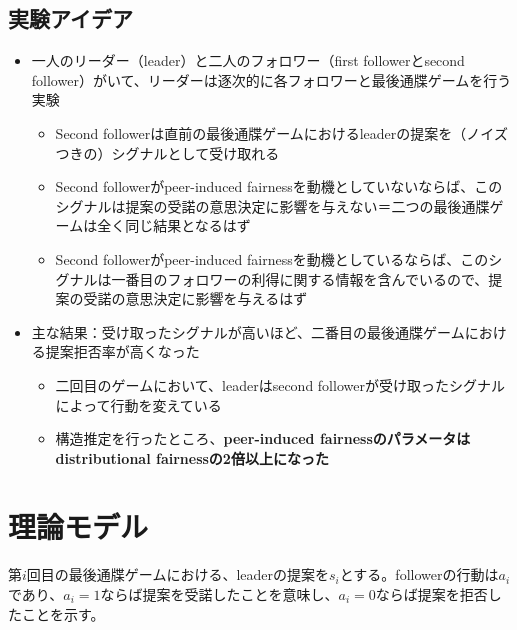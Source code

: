 \documentclass[../root]{subfiles}
\begin{document}
    \hypertarget{ux5b9fux9a13ux30a2ux30a4ux30c7ux30a2}{%
    \subsection{実験アイデア}\label{ux5b9fux9a13ux30a2ux30a4ux30c7ux30a2}}

    \begin{itemize}
    
    \item
      一人のリーダー（leader）と二人のフォロワー（first followerとsecond follower）がいて、リーダーは逐次的に各フォロワーと最後通牒ゲームを行う実験

      \begin{itemize}
      
      \item
        Second followerは直前の最後通牒ゲームにおけるleaderの提案を（ノイズつきの）シグナルとして受け取れる
      \item
        Second followerがpeer-induced fairnessを動機としていないならば、このシグナルは提案の受諾の意思決定に影響を与えない＝二つの最後通牒ゲームは全く同じ結果となるはず
      \item
        Second followerがpeer-induced fairnessを動機としているならば、このシグナルは一番目のフォロワーの利得に関する情報を含んでいるので、提案の受諾の意思決定に影響を与えるはず
      \end{itemize}
    \item
      主な結果：受け取ったシグナルが高いほど、二番目の最後通牒ゲームにおける提案拒否率が高くなった

      \begin{itemize}
      
      \item
        二回目のゲームにおいて、leaderはsecond followerが受け取ったシグナルによって行動を変えている
      \item
        構造推定を行ったところ、\textbf{peer-induced fairnessのパラメータはdistributional fairnessの2倍以上になった}
      \end{itemize}
    \end{itemize}

    \hypertarget{ux7406ux8ad6ux30e2ux30c7ux30eb}{%
    \section{理論モデル}\label{ux7406ux8ad6ux30e2ux30c7ux30eb}}

    第\(i\)回目の最後通牒ゲームにおける、leaderの提案を\(s_i\)とする。followerの行動は\(a_i\)であり、\(a_i = 1\)ならば提案を受諾したことを意味し、\(a_i = 0\)ならば提案を拒否したことを示す。
\end{document}
